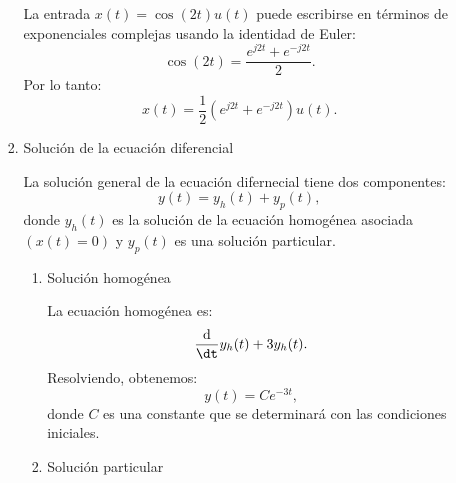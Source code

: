 \begin{enumerate}[label=\color{red}\textbf{\arabic*)}]
\begin{enumerate}[label=\color{red}\textbf{\alph*)}]
\begin{enumerate}[label=Paso \arabic*:]
              La entrada $x(t)=\cos(2t)u(t)$ puede escribirse en términos de exponenciales complejas usando la identidad de Euler: \[
              \cos(2t)=\dfrac{e^{j2t}+e^{-j 2t}  }{2}.
              \] 
              Por lo tanto: \[
              x(t)=\dfrac{1}{2}\left( e^{j 2t}+e^{-j 2t}   \right) u(t).
              \] 
          \item Solución de la ecuación diferencial

              La solución general de la ecuación difernecial tiene dos componentes: \[
              y(t)=y_h(t)+y_p(t),
              \] donde $y_h(t)$ es la solución de la ecuación homogénea asociada  $(x(t)=0)$ y  $y_p(t)$ es una solución particular.
               \begin{enumerate}[label=\alph*)]
                  \item Solución homogénea

                      La ecuación homogénea es: \[
                      \dfrac{\mathrm{d}}{\dt}y_h(t)+3y_h(t).
                      \]
                      Resolviendo, obtenemos: \[
                      y(t)=Ce^{-3t} ,
                      \] donde $C$ es una constante que se determinará con las condiciones iniciales.
                  \item Solución particular


\end{enumerate}
\end{enumerate}
\end{enumerate}
\end{enumerate}
